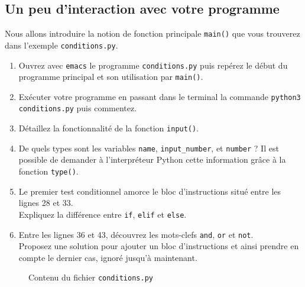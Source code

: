 \subsection{Un peu d'interaction avec votre programme}




Nous  allons introduire  la  notion de  fonction
principale   \texttt{main()}  que   vous   trouverez  dans   l'exemple
\texttt{conditions.py}.


\begin{enumerate}


\item  Ouvrez avec  \texttt{emacs} le  programme \texttt{conditions.py}
  puis repérez le début du programme principal et son utilisation par
  \texttt{main()}.

\item Exécuter votre programme en passant dans le terminal la commande
  \texttt{python3 conditions.py} puis commentez.


\item Détaillez la fonctionnalité de la fonction \texttt{input()}.

\item De quels types sont les variables \texttt{name}, \texttt{input\_number},
et \texttt{number} ? Il est possible de demander à l'interpréteur Python cette information grâce à la fonction \texttt{type()}.


\item Le premier test conditionnel amorce le bloc d'instructions
  situé entre  les lignes 28  et 33.\\ Expliquez la  différence entre
  \texttt{if}, \texttt{elif} et \texttt{else}.

\item  Entre   les  lignes  36   et  43,  découvrez  les   mots-clefs
  \texttt{and}, \texttt{or}  et \texttt{not}.\\ Proposez  une solution
  pour ajouter  un bloc  d'instructions et ainsi  prendre en  compte le
  dernier cas, ignoré jusqu'à maintenant.


\end{enumerate}


\begin{figure}  
  
  \caption{Contenu du fichier \texttt{conditions.py}}
  \label{polynome_conditions}
\end{figure}




